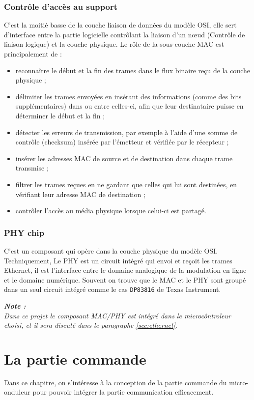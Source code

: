 \documentclass[11pt, a4paper, twoside]{book}
\begin{document}
{\subsection{Contrôle d'accès au support}
C'est la moitié basse de la couche liaison de données du modèle OSI, elle sert d'interface entre la partie logicielle contrôlant la liaison d'un nœud (Contrôle de liaison logique) et la couche physique. Le rôle de la sous-couche MAC est principalement de :
\begin{itemize}
\item reconnaître le début et la fin des trames dans le flux binaire reçu de la couche physique ;
\item délimiter les trames envoyées en insérant des informations (comme des bits supplémentaires) dans ou entre celles-ci, afin que leur destinataire puisse en déterminer le début et la fin ;
\item détecter les erreurs de transmission, par exemple à l'aide d'une somme de contrôle (checksum) insérée par l'émetteur et vérifiée par le récepteur ;
\item insérer les adresses MAC de source et de destination dans chaque trame transmise ;
\item filtrer les trames reçues en ne gardant que celles qui lui sont destinées, en vérifiant leur adresse MAC de destination ;
\item contrôler l'accès au média physique lorsque celui-ci est partagé.
\end{itemize}
\subsection{PHY chip}
C'est un composant qui opère dans la couche physique du modèle OSI. Techniquement, Le PHY est un circuit intégré qui envoi et reçoit les trames Ethernet, il est l'interface entre le domaine analogique de la modulation en ligne et le domaine numérique. Souvent on trouve que le MAC et le PHY sont groupé dans un seul circuit intégré comme le cas \texttt{DP83816} de Texas Instrument.
\begin{center}
\textbf{\emph{Note :}}\\
\emph{Dans ce projet le composant MAC/PHY est intégré dans le microcôntroleur choisi, et il sera discuté dans le paragraphe \ref{sec:ethernet}}.
\end{center}

\chapter{La partie commande}
Dans ce chapitre, on s'intéresse à la conception de la partie commande du micro-onduleur pour pouvoir intégrer la partie communication efficacement.
}
\end{document}
